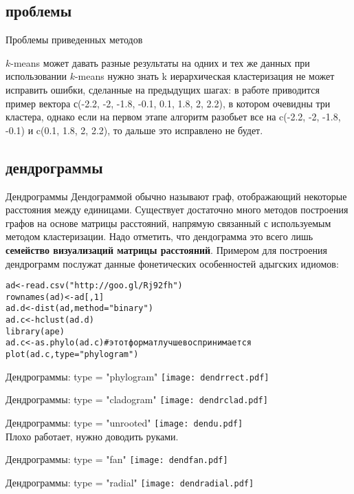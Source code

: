 \subsection{проблемы}
\begin{frame}{Проблемы приведенных методов}
\begin{itemize}
\mytem $k$-means может давать разные результаты на одних и тех же данных
\mytem при использовании $k$-means нужно знать k
\mytem иерархическая кластеризация не может исправить ошибки, сделанные на предыдущих шагах: в работе \citep{hawkins82} приводится пример вектора  с(-2.2, -2, -1.8, \alert{-0.1, 0.1,} 1.8, 2, 2.2), в котором очевидны три кластера, однако если на первом этапе алгоритм разобьет все на c(-2.2, -2, -1.8, -0.1) и c(0.1, 1.8, 2, 2.2), то дальше это исправлено не будет.
\end{itemize}
\end{frame}
\subsection{дендрограммы}
\begin{frame}{Дендрограммы}
Дендограммой обычно называют граф, отображающий некоторые расстояния между единицами. Существует достаточно много методов построения графов на основе матрицы расстояний, напрямую связанный с используемым методом кластеризации. Надо отметить, что дендограмма это всего лишь \textbf{семейство визуализаций матрицы расстояний}. Примером для построения дендрограмм послужат данные фонетических особенностей адыгских идиомов:\\
\scriptsize
\begin{alltt}
ad <- read.csv("http://goo.gl/Rj92fh")\\
rownames(ad) <- ad[,1]\\
ad.d <- dist(ad, method = "binary")\\
ad.c <- hclust(ad.d)\\
\alert{library(ape)}\\
ad.c <- \alert{as.phylo(}ad.c\alert{)} \hfill \# этот формат лучше воспринимается\\
\alert{plot(ad.c, type = "phylogram")}
\end{alltt}
\normalsize
\end{frame}
\begin{frame}{Дендрограммы: type = "phylogram"}
\texttt{[image: dendrrect.pdf]}
\end{frame}
\begin{frame}{Дендрограммы: type = "cladogram"}
\texttt{[image: dendrclad.pdf]}
\end{frame}
\begin{frame}{Дендрограммы: type = "unrooted"}
\texttt{[image: dendu.pdf]}\\
Плохо работает, нужно доводить руками.
\end{frame}
\begin{frame}{Дендрограммы: type = "fan"}
\texttt{[image: dendfan.pdf]}
\end{frame}
\begin{frame}{Дендрограммы: type = "radial"}
\texttt{[image: dendradial.pdf]}
\end{frame}
